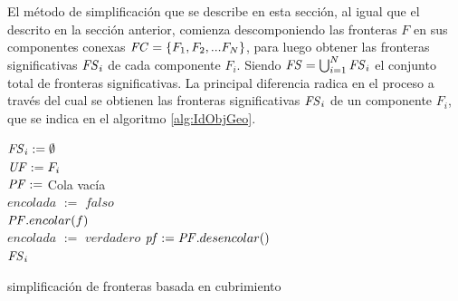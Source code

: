 El método de simplificación que se describe en esta sección, al igual que el
descrito en la sección anterior, comienza descomponiendo las fronteras $F$ en
sus componentes conexas $\mathit{FC}=\{F_1,F_2,...F_N\}$, para luego obtener las
fronteras significativas $\mathit{FS}_i$ de cada componente $F_i$. Siendo
$\mathit{FS} = \bigcup^N_{i=1} \mathit{FS}_i$ el conjunto total de fronteras
significativas. La principal diferencia radica en el proceso a través del cual
se obtienen las fronteras significativas $\mathit{FS}_i$ de un componente $F_i$, que
se indica en el algoritmo \ref{alg:IdObjGeo}.

\begin{algorithm}[H]
\SetAlgoLined

  $\mathit{FS}_i := \emptyset$\\
  $\mathit{UF} := F_i$ \\

  $\mathit{PF} :=$ Cola vacía \\
   {
    $encolada$ $:=$ $falso$ \\
     {
       {
        $\mathit{PF}.encolar(f)$\\
        $encolada$ $:=$ $verdadero$
      }
    }
  }
   {
    $\mathit{pf} := \mathit{PF}.desencolar()$\\
  }
  \Return $\mathit{FS}_i$ 

  \caption{simplificación de fronteras basada en cubrimiento}
  \label{alg:IdObjGeo}
\end{algorithm}

